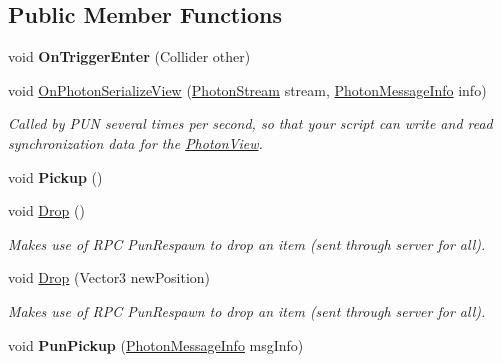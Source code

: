\subsection*{Public Member Functions}
\begin{DoxyCompactItemize}
\item 
void {\bfseries On\+Trigger\+Enter} (Collider other)\hypertarget{class_pickup_item_a785a8b65e46fc44ab4fdeb5411e01351}{}\label{class_pickup_item_a785a8b65e46fc44ab4fdeb5411e01351}

\item 
void \hyperlink{class_pickup_item_a7b6809bac46d2eaddc309e2ad97167fa}{On\+Photon\+Serialize\+View} (\hyperlink{class_photon_stream}{Photon\+Stream} stream, \hyperlink{class_photon_message_info}{Photon\+Message\+Info} info)
\begin{DoxyCompactList}\small\item\em Called by P\+UN several times per second, so that your script can write and read synchronization data for the \hyperlink{class_photon_view}{Photon\+View}. \end{DoxyCompactList}\item 
void {\bfseries Pickup} ()\hypertarget{class_pickup_item_aed8f232a2849e9640b1ba4f32077bb16}{}\label{class_pickup_item_aed8f232a2849e9640b1ba4f32077bb16}

\item 
void \hyperlink{class_pickup_item_aa23d18ee93cd9591072f01da535370bc}{Drop} ()
\begin{DoxyCompactList}\small\item\em Makes use of R\+PC Pun\+Respawn to drop an item (sent through server for all).\end{DoxyCompactList}\item 
void \hyperlink{class_pickup_item_a7fab906a78c790fe991bf63a812ae8cf}{Drop} (Vector3 new\+Position)
\begin{DoxyCompactList}\small\item\em Makes use of R\+PC Pun\+Respawn to drop an item (sent through server for all).\end{DoxyCompactList}\item 
void {\bfseries Pun\+Pickup} (\hyperlink{class_photon_message_info}{Photon\+Message\+Info} msg\+Info)\hypertarget{class_pickup_item_a2a170d7c2a6c7bd0e0491ab233380186}{}\label{class_pickup_item_a2a170d7c2a6c7bd0e0491ab233380186}

\end{DoxyCompactItemize}
